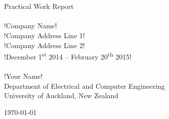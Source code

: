 \begin{titlepage}
\begin{center}

\\~\\\vspace{3cm}
{\huge Practical Work Report}\\[2cm]

\HRule \\[0.5cm]
{\LARGE !Company Name!}\\[0.3cm]
{\large !Company Address Line 1!\\
!Company Address Line 2!}\\[0.3cm]
!December 1\textsuperscript{st} 2014 -- February 20\textsuperscript{th} 2015!\\[0.3cm]
\HRule \\[2cm]

{\large !Your Name!}\\[0.5cm]
Department of Electrical and Computer Engineering\\[0.2cm]
University of Auckland, New Zealand

\vfill
{\large \today}

\end{center}
\end{titlepage}